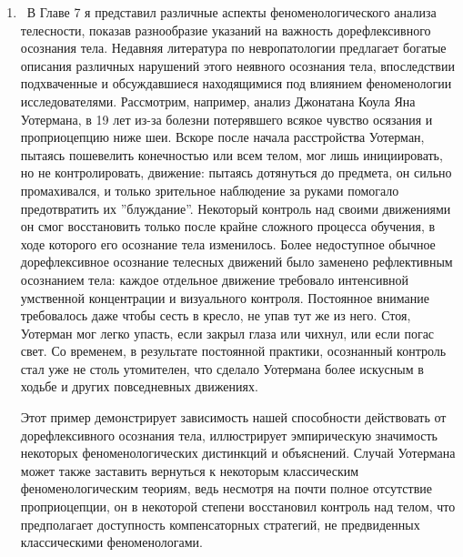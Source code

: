 \documentclass[11pt]{book}
\begin{document}
\begin{enumerate}

  \item\ В Главе 7 я представил различные аспекты феноменологического анализа телесности, показав разнообразие указаний на важность дорефлексивного осознания тела. Недавняя литература по невропатологии предлагает богатые описания различных нарушений этого неявного осознания тела, впоследствии подхваченные и обсуждавшиеся находящимися под влиянием феноменологии исследователями. Рассмотрим, например, анализ Джонатана Коула Яна Уотермана, в 19 лет из-за болезни потерявшего всякое чувство осязания и проприоцепцию ниже шеи. Вскоре после начала расстройства Уотерман, пытаясь пошевелить конечностью или всем телом, мог лишь инициировать, но не контролировать, движение: пытаясь дотянуться до предмета, он сильно промахивался, и только зрительное наблюдение за руками помогало предотвратить их ''блуждание''. Некоторый контроль над своими движениями он смог восстановить только после крайне сложного процесса обучения, в ходе которого его осознание тела изменилось. Более недоступное обычное дорефлексивное осознание телесных движений было заменено рефлективным осознанием тела: каждое отдельное движение требовало интенсивной умственной концентрации и визуального контроля. Постоянное внимание требовалось даже чтобы сесть в кресло, не упав тут же из него. Стоя, Уотерман мог легко упасть, если закрыл глаза или чихнул, или если погас свет. Со временем, в результате постоянной практики, осознанный контроль стал уже не столь утомителен, что сделало Уотермана более искусным в ходьбе и других повседневных движениях.

Этот пример демонстрирует зависимость нашей способности действовать от дорефлексивного осознания тела, иллюстрирует эмпирическую значимость некоторых феноменологических дистинкций и объяснений. Случай Уотермана может также заставить вернуться к некоторым классическим феноменологическим теориям, ведь несмотря на почти полное отсутствие проприоцепции, он в некоторой степени восстановил контроль над телом, что предполагает доступность компенсаторных стратегий, не предвиденных классическими феноменологами.


\end{enumerate}
\end{document}
